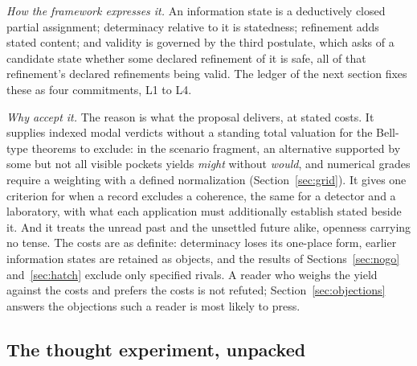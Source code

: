 \textit{How the framework expresses it.} An information state is a deductively closed partial assignment; determinacy relative to it is statedness; refinement adds stated content; and validity is governed by the third postulate, which asks of a candidate state whether some declared refinement of it is safe, all of that refinement's declared refinements being valid. The ledger of the next section fixes these as four commitments, L1 to L4.

\textit{Why accept it.} The reason is what the proposal delivers, at stated costs. It supplies indexed modal verdicts without a standing total valuation for the Bell-type theorems to exclude: in the scenario fragment, an alternative supported by some but not all visible pockets yields \emph{might} without \emph{would}, and numerical grades require a weighting with a defined normalization (Section~\ref{sec:grid}). It gives one criterion for when a record excludes a coherence, the same for a detector and a laboratory, with what each application must additionally establish stated beside it. And it treats the unread past and the unsettled future alike, openness carrying no tense. The costs are as definite: determinacy loses its one-place form, earlier information states are retained as objects, and the results of Sections~\ref{sec:nogo} and~\ref{sec:hatch} exclude only specified rivals. A reader who weighs the yield against the costs and prefers the costs is not refuted; Section~\ref{sec:objections} answers the objections such a reader is most likely to press.

\subsection{The thought experiment, unpacked}\label{sec:hitchhiker}

